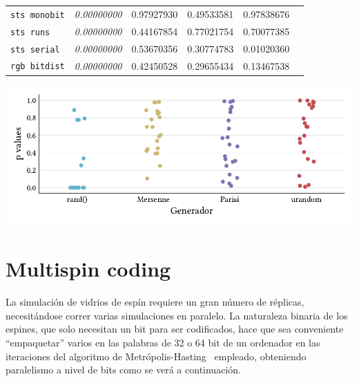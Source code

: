 \documentclass[11pt]{report}
\begin{document}
\begin{appendices}
\begin{center}
\begin{tabular}{lccccc}
    \verb|sts monobit|          & \textit{\textcolor{FAILED}{0.00000000}}   & \textcolor{PASSED}{0.97927930}            & \textcolor{PASSED}{0.49533581}            & \textcolor{PASSED}{0.97838676}            \\
    \verb|sts runs|             & \textit{\textcolor{FAILED}{0.00000000}}   & \textcolor{PASSED}{0.44167854}            & \textcolor{PASSED}{0.77021754}            & \textcolor{PASSED}{0.70077385}            \\
    \verb|sts serial|           & \textit{\textcolor{FAILED}{0.00000000}}   & \textcolor{PASSED}{0.53670356}            & \textcolor{PASSED}{0.30774783}            & \textcolor{PASSED}{0.01020360}            \\
    \verb|rgb bitdist|          & \textit{\textcolor{FAILED}{0.00000000}}   & \textcolor{PASSED}{0.42450528}            & \textcolor{PASSED}{0.29655434}            & \textcolor{PASSED}{0.13467538}            \\
    \bottomrule
  \end{tabular}
\end{center}

\begin{center}
  \includegraphics{../study_cases/dieharder/summary.pdf}
\end{center}



\chapter{Multispin coding}
\label{chap:multispin}

La simulación de vidrios de espín requiere un gran número de réplicas,
necesitándose correr varias simulaciones en paralelo. La naturaleza
binaria de los espines, que solo necesitan un bit para ser
codificados, hace que sea conveniente ``empaquetar'' varios en las
palabras de 32 o 64 bit de un ordenador en las iteraciones del
algoritmo de Metrópolis-Hasting~\cite{metropolis} empleado,
obteniendo paralelismo a nivel de bits como se verá a continuación.


\end{appendices}
\end{document}
